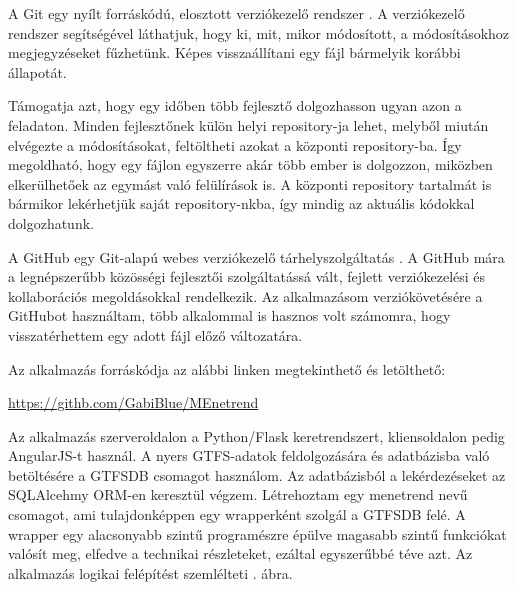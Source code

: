 
A Git egy nyílt forráskódú, elosztott verziókezelő rendszer \cite{git}. A verziókezelő rendszer segítségével láthatjuk, hogy ki, mit, mikor módosított, a módosításokhoz megjegyzéseket fűzhetünk. Képes visszaállítani egy fájl bármelyik korábbi állapotát.

Támogatja azt, hogy egy időben több fejlesztő dolgozhasson ugyan azon a feladaton. Minden fejlesztőnek külön helyi repository-ja lehet, melyből miután elvégezte a módosításokat, feltöltheti azokat a központi repository-ba. Így megoldható, hogy egy fájlon egyszerre akár több ember is dolgozzon, miközben elkerülhetőek az egymást való felülírások is. A központi repository tartalmát is bármikor lekérhetjük saját repository-nkba, így mindig az aktuális kódokkal dolgozhatunk.


A GitHub egy Git-alapú webes verziókezelő tárhelyszolgáltatás \cite{github}. A GitHub mára a legnépszerűbb közösségi fejlesztői szolgáltatássá vált, fejlett verziókezelési és kollaborációs megoldásokkal rendelkezik. Az alkalmazásom verziókövetésére a GitHubot használtam, több alkalommal is hasznos volt számomra, hogy visszatérhettem egy adott fájl előző változatára.

Az alkalmazás forráskódja az alábbi linken megtekinthető és letölthető:
\begin{center}
\url{https://githb.com/GabiBlue/MEnetrend}
\end{center}


Az alkalmazás szerveroldalon a Python/Flask keretrendszert, kliensoldalon pedig An\-gu\-lar\-JS-t használ. A nyers GTFS-adatok feldolgozására és adatbázisba való betöltésére a GTFSDB csomagot használom. Az adatbázisból a lekérdezéseket az SQLAlcehmy ORM-en keresztül végzem. Létrehoztam egy menetrend nevű csomagot, ami tulajdonképpen egy wrapperként szolgál a GTFSDB felé. A wrapper egy alacsonyabb szintű programészre épülve magasabb szintű funkciókat valósít meg, elfedve a technikai részleteket, ezáltal egyszerűbbé téve azt. Az alkalmazás logikai felépítést szemlélteti . ábra.

